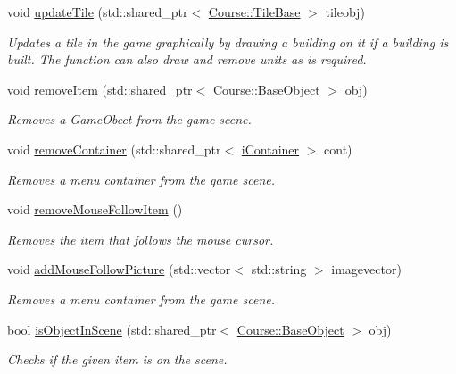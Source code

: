 \begin{DoxyCompactItemize}
void \hyperlink{class_student_1_1_game_scene_a7c3301a7e8cdbf52eabd789cd7741c25}{update\-Tile} (std\-::shared\-\_\-ptr$<$ \hyperlink{class_course_1_1_tile_base}{Course\-::\-Tile\-Base} $>$ tileobj)
\begin{DoxyCompactList}\small\item\em Updates a tile in the game graphically by drawing a building on it if a building is built. The function can also draw and remove units as is required. \end{DoxyCompactList}\item 
void \hyperlink{class_student_1_1_game_scene_ad496f5f342bbd98d275b757c77161bbf}{remove\-Item} (std\-::shared\-\_\-ptr$<$ \hyperlink{class_course_1_1_base_object}{Course\-::\-Base\-Object} $>$ obj)
\begin{DoxyCompactList}\small\item\em Removes a Game\-Obect from the game scene. \end{DoxyCompactList}\item 
void \hyperlink{class_student_1_1_game_scene_a14018146bcc2e5849f8bfbd88d02fa4f}{remove\-Container} (std\-::shared\-\_\-ptr$<$ \hyperlink{class_student_1_1i_container}{i\-Container} $>$ cont)
\begin{DoxyCompactList}\small\item\em Removes a menu container from the game scene. \end{DoxyCompactList}\item 
void \hyperlink{class_student_1_1_game_scene_ab49d7189a3475ce719055c8f3f562535}{remove\-Mouse\-Follow\-Item} ()
\begin{DoxyCompactList}\small\item\em Removes the item that follows the mouse cursor. \end{DoxyCompactList}\item 
void \hyperlink{class_student_1_1_game_scene_a98c0a4ad385e050cbe463fc28e7619aa}{add\-Mouse\-Follow\-Picture} (std\-::vector$<$ std\-::string $>$ imagevector)
\begin{DoxyCompactList}\small\item\em Removes a menu container from the game scene. \end{DoxyCompactList}\item 
bool \hyperlink{class_student_1_1_game_scene_afc442856a25e9a5e5b46d9565abb7b9b}{is\-Object\-In\-Scene} (std\-::shared\-\_\-ptr$<$ \hyperlink{class_course_1_1_base_object}{Course\-::\-Base\-Object} $>$ obj)
\begin{DoxyCompactList}\small\item\em Checks if the given item is on the scene. \end{DoxyCompactList}\item 

\end{DoxyCompactItemize}
